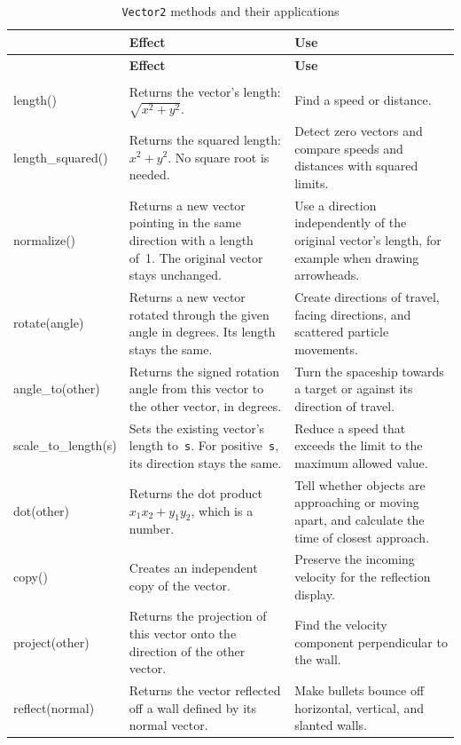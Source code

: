 \begin{longtable}{>{\ttfamily}lp{5.2cm}p{5.2cm}}
	\caption{\texttt{Vector2} methods and their applications}
	\label{tabVectorSummaryMethods}\\
	\toprule
	{\normalfont\textbf{Method}}
	& \textbf{Effect}
	& \textbf{Use} \\
	\midrule
	\endfirsthead
	
	\toprule
	{\normalfont\textbf{Method}}
	& \textbf{Effect}
	& \textbf{Use} \\
	\midrule
	\endhead
	
	\midrule
	\multicolumn{3}{r}{\emph{Continued on the next page}} \\
	\endfoot
	
	\bottomrule
	\endlastfoot
	
	length()
	& Returns the vector's length: $\sqrt{x^2+y^2}$.
	& Find a speed or distance. \\
	
	length\_squared()
	& Returns the squared length: $x^2+y^2$. No square root is needed.
	& Detect zero vectors and compare speeds and distances with squared limits. \\
	
	normalize()
	& Returns a new vector pointing in the same direction with a length of~1. The original vector stays unchanged.
	& Use a direction independently of the original vector's length, for example when drawing arrowheads. \\
	
	rotate(angle)
	& Returns a new vector rotated through the given angle in degrees. Its length stays the same.
	& Create directions of travel, facing directions, and scattered particle movements. \\
	
	angle\_to(other)
	& Returns the signed rotation angle from this vector to the other vector, in degrees.
	& Turn the spaceship towards a target or against its direction of travel. \\
	
	scale\_to\_length(s)
	& Sets the existing vector's length to~\texttt{s}. For positive~\texttt{s}, its direction stays the same.
	& Reduce a speed that exceeds the limit to the maximum allowed value. \\
	
	dot(other)
	& Returns the dot product $x_1x_2+y_1y_2$, which is a number.
	& Tell whether objects are approaching or moving apart, and calculate the time of closest approach. \\
	
	copy()
	& Creates an independent copy of the vector.
	& Preserve the incoming velocity for the reflection display. \\
	
	project(other)
	& Returns the projection of this vector onto the direction of the other vector.
	& Find the velocity component perpendicular to the wall. \\
	
	reflect(normal)
	& Returns the vector reflected off a wall defined by its normal vector.
	& Make bullets bounce off horizontal, vertical, and slanted walls. \\
\end{longtable}

